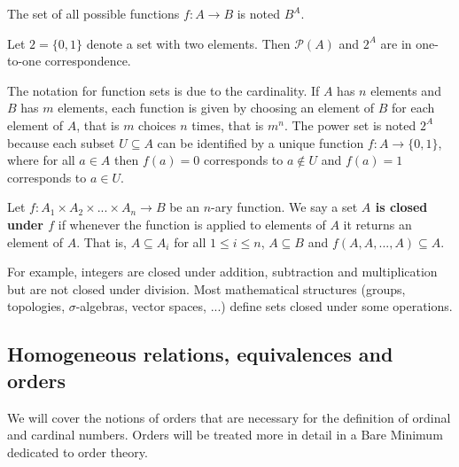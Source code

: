 \documentclass{bareminimum}
\begin{document}
\begin{defn}
	The set  of all possible functions $f : A \to B$ is noted $B^A$.
\end{defn}

\begin{prop}
	Let $2 = \{0, 1\}$ denote a set with two elements. Then $\mathcal{P}(A)$ and $2^A$ are in one-to-one correspondence.
\end{prop}

\begin{remark}
	The notation for function sets is due to the cardinality. If $A$ has $n$ elements and $B$ has $m$ elements, each function is given by choosing an element of $B$ for each element of $A$, that is $m$ choices $n$ times, that is $m^n$. The power set is noted $2^A$ because each subset $U \subseteq A$ can be identified by a unique function $f : A \to \{0 , 1\}$, where for all $a\in A$ then $f(a)=0$ corresponds to $a \notin U$ and $f(a)=1$ corresponds to $a \in U$.
\end{remark}

\begin{defn}
	Let $f : A_1 \times A_2 \times ... \times A_n \to B$ be an $n$-ary function. We say a set \textbf{$A$ is closed under $f$} if whenever the function is applied to elements of $A$ it returns an element of $A$. That is, $A \subseteq A_i$ for all $1\leq i \leq n$, $A \subseteq B$ and $f(A, A, ..., A) \subseteq A$.
\end{defn}

\begin{remark}
	For example, integers are closed under addition, subtraction and multiplication but are not closed under division. Most mathematical structures (groups, topologies, $\sigma$-algebras, vector spaces, ...) define sets closed under some operations.
\end{remark}


\subsection{Homogeneous relations, equivalences and orders}

\begin{remark}
	We will cover the notions of orders that are necessary for the definition of ordinal and cardinal numbers. Orders will be treated more in detail in a Bare Minimum dedicated to order theory.
\end{remark}
\end{document}
